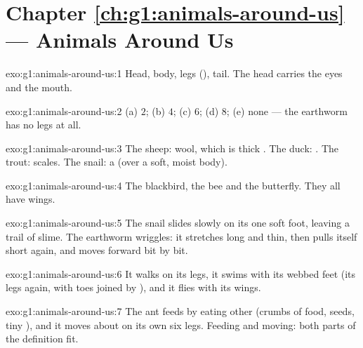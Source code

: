 \section*{Chapter \ref{ch:g1:animals-around-us} --- Animals Around Us}

\begin{solution}{exo:g1:animals-around-us:1}
Head, body, legs (), tail. The head carries the eyes and the
mouth.
\end{solution}

\begin{solution}{exo:g1:animals-around-us:2}
(a) $2$; (b) $4$; (c) $6$; (d) $8$; (e) none --- the earthworm has
no legs at all.
\end{solution}

\begin{solution}{exo:g1:animals-around-us:3}
The sheep: wool, which is thick . The duck: . The trout:
scales. The snail: a  (over a soft, moist body).
\end{solution}

\begin{solution}{exo:g1:animals-around-us:4}
The blackbird, the bee and the butterfly. They all have wings.
\end{solution}

\begin{solution}{exo:g1:animals-around-us:5}
The snail slides slowly on its one soft foot, leaving a trail of
slime. The earthworm wriggles: it stretches long and thin, then
pulls itself short again, and moves forward bit by bit.
\end{solution}

\begin{solution}{exo:g1:animals-around-us:6}
It walks on its legs, it swims with its webbed feet (its legs
again, with toes joined by ), and it flies with its wings.
\end{solution}

\begin{solution}{exo:g1:animals-around-us:7}
The ant feeds by eating other  (crumbs of food, seeds,
tiny ), and it moves about on its own six legs. Feeding and
moving: both parts of the definition fit.
\end{solution}

